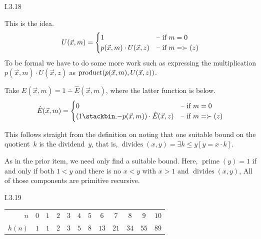 \begin{ans}{I.3.18}
\begin{exparts}
\item This is the idea.
\begin{equation*}
  U(\vec{x},m)=
  \begin{cases}
    1    &\text{-- \text{if $m=0$}}   \\
    p(\vec{x},m)\cdot U(\vec{x},z)  &\text{-- \text{if $m=\succ(z)$}}
  \end{cases}
\end{equation*}
To be formal we have to do some more work such as
expressing the multiplication
$p(\vec{x},m)\cdot U(\vec{x},z)$ as $\operatorname{product}(p(\vec{x},m), U(\vec{x},z))$.

\item Take $E(\vec{x},m)=1\dotminus \hat{E}(\vec{x},m)$, where the latter
function is below.
\begin{equation*}
  \hat{E}(\vec{x},m)=
  \begin{cases}
    0    &\case{\text{if $m=0$}}   \\
    (1\dotminus p(\vec{x},m))\cdot \hat{E}(\vec{x},z)
        &\case{\text{if $m=\succ(z)$}}
  \end{cases}
\end{equation*}

\item This follows straight from the definition on noting that one suitable
bound on the quotient~$k$ is the dividend~$y$, that is,
$\operatorname{divides}(x,y)=
\exists k\leq y[y=x\cdot k]$.

\item As in the prior item, we need only find a suitable bound.
Here, $\operatorname{prime}(y)=1$ if and only if
both $1<y$ and
there is no $x< y$ with $x>1$ and $\operatorname{divides}(x,y)$,
All of those components are primitive recursive.
\end{exparts}
\end{ans}
%
\begin{ans}{I.3.19}
\begin{exparts}
\item
\begin{center}
\begin{tabular}{r|ccccccccccc}
  $n$    &$0$ &$1$ &$2$ &$3$ &$4$ &$5$ &$6$  &$7$  &$8$  &$9$  &$10$    \\
  $h(n)$ &$1$ &$1$ &$2$ &$3$ &$5$ &$8$ &$13$ &$21$ &$34$ &$55$ &$89$   \\
\end{tabular}
\end{center}
\end{exparts}
\end{ans}
